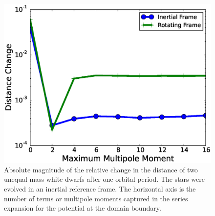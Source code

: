 \documentclass[12pt]{article}
\begin{document}
\begin{figure}[h!]
  \centering
  \includegraphics[scale=0.8,trim=0.1in 0.0in 0.65in 0.4in,clip]{plots/gravity_bcs}
  \caption[Distance change due to multipole boundary conditions]
          {Absolute magnitude of the relative change in the distance of two unequal mass white dwarfs after one orbital period. 
           The stars were evolved in an inertial reference frame. The horizontal axis is the number of terms or multipole moments 
           captured in the series expansion for the potential at the domain boundary.\label{fig:gravity_bcs}}
\end{figure}
\end{document}
